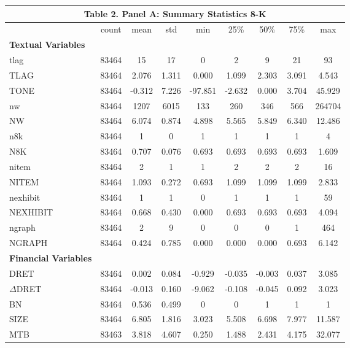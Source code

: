 \begin{table}[htbp] \label{T2PA}
   \begin{center}
    \begin{tabular}{lcccccccc}
    \multicolumn{9}{c}{\textbf{Table 2. Panel A: Summary Statistics 8-K}} \\
    \midrule
    \midrule
      & count & mean & std & min & 25\% & 50\% & 75\% & max \\
    \midrule
    \textbf{Textual Variables} &   &   &   &   &   &   &   &  \\
    tlag & 83464 & 15 & 17 & 0 & 2 & 9 & 21 & 93 \\
    TLAG & 83464 & 2.076 & 1.311 & 0.000 & 1.099 & 2.303 & 3.091 & 4.543 \\
    TONE & 83464 & -0.312 & 7.226 & -97.851 & -2.632 & 0.000 & 3.704 & 45.929 \\
    nw & 83464 & 1207 & 6015 & 133 & 260 & 346 & 566 & 264704 \\
    NW & 83464 & 6.074 & 0.874 & 4.898 & 5.565 & 5.849 & 6.340 & 12.486 \\
    n8k & 83464 & 1 & 0 & 1 & 1 & 1 & 1 & 4 \\
    N8K & 83464 & 0.707 & 0.076 & 0.693 & 0.693 & 0.693 & 0.693 & 1.609 \\
    nitem & 83464 & 2 & 1 & 1 & 2 & 2 & 2 & 16 \\
    NITEM & 83464 & 1.093 & 0.272 & 0.693 & 1.099 & 1.099 & 1.099 & 2.833 \\
    nexhibit & 83464 & 1 & 1 & 0 & 1 & 1 & 1 & 59 \\
    NEXHIBIT & 83464 & 0.668 & 0.430 & 0.000 & 0.693 & 0.693 & 0.693 & 4.094 \\
    ngraph & 83464 & 2 & 9 & 0 & 0 & 0 & 1 & 464 \\
    NGRAPH & 83464 & 0.424 & 0.785 & 0.000 & 0.000 & 0.000 & 0.693 & 6.142 \\
    \textbf{Financial Variables} &   &   &   &   &   &   &   &  \\
    DRET & 83464 & 0.002 & 0.084 & -0.929 & -0.035 & -0.003 & 0.037 & 3.085 \\
    $\Delta$DRET & 83464 & -0.013 & 0.160 & -9.062 & -0.108 & -0.045 & 0.092 & 3.023 \\
    BN & 83464 & 0.536 & 0.499 & 0 & 0 & 1 & 1 & 1 \\
    SIZE & 83464 & 6.805 & 1.816 & 3.023 & 5.508 & 6.698 & 7.977 & 11.587 \\
    MTB & 83463 & 3.818 & 4.607 & 0.250 & 1.488 & 2.431 & 4.175 & 32.077 \\

\end{tabular}
\end{center}
\end{table}
